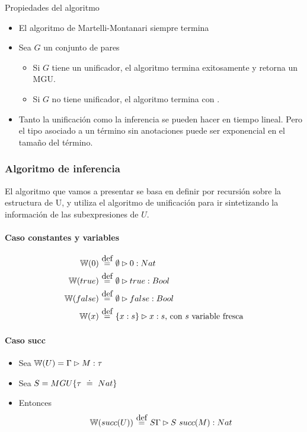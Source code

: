 \begin{teo}
  Propiedades del algoritmo
  \begin{itemize}
    \item El algoritmo de Martelli-Montanari siempre termina
    \item Sea $G$ un conjunto de pares
      \begin{itemize}
        \item Si $G$ tiene un unificador, el algoritmo termina exitosamente y retorna un MGU.
        \item Si $G$ no tiene unificador, el algoritmo termina con .
      \end{itemize}
    \item Tanto la unificación como la inferencia se pueden hacer en tiempo lineal. Pero el tipo asociado a un término sin anotaciones puede ser exponencial en el tamaño del término.
  \end{itemize}
\end{teo}

\subsubsection{Algoritmo de inferencia}

El algoritmo que vamos a presentar se basa en definir  por recursión sobre la estructura de U, y utiliza el algoritmo de unificación para ir sintetizando la información de las subexpresiones de $U$.

\paragraph{Caso constantes y variables}

\begin{align*}
  \w{0} &\eqdef \emptyset \rhd 0 : Nat \\
  \w{true} &\eqdef \emptyset \rhd true : Bool \\
  \w{false} &\eqdef \emptyset \rhd false : Bool \\
  \w{x} &\eqdef \{x:s\} \rhd x : s \text{, con $s$ variable fresca} \\
\end{align*}

\paragraph{Caso succ}

\begin{itemize}
  \item Sea $\mathbb{W}(U) = \Gamma \rhd M : \tau$
  \item Sea $S = MGU\{\tau \uni Nat\}$
  \item Entonces
  \[\w{succ(U)} \eqdef S\Gamma \rhd S\ succ(M) : Nat\]
\end{itemize}

